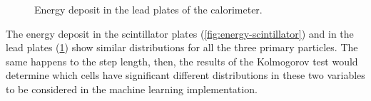 \begin{figure}[htb!]
  \caption{Energy deposit in the lead plates of the calorimeter.}\label{fig:energy-lead}

\end{figure}

The energy deposit in the scintillator plates (\cref{fig:energy-scintillator})
and in the lead plates (\cref{fig:energy-lead}) show similar distributions for
all the three primary particles. The same happens to the step length, then, the
results of the Kolmogorov test would determine which cells have significant
different distributions in these two variables to be considered in the machine
learning implementation.

\begin{figure}[htb!]
  \centering

  \hspace{1em}
  \hspace{1em}

\end{figure}
